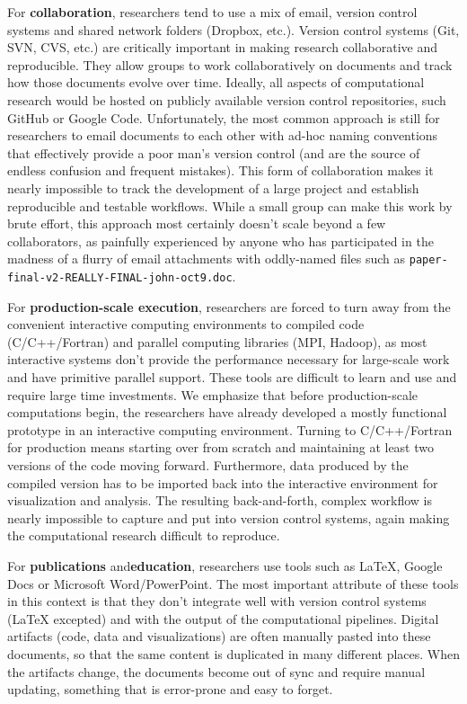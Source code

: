\documentclass[ChapterTOCs,krantz2]{krantz} %
\begin{document}
For \textbf{collaboration}, researchers tend to use a mix of email, version
control systems and shared network folders (Dropbox, etc.).  Version control
systems (Git, SVN, CVS, etc.) are critically important in making research
collaborative and reproducible. They allow groups to work collaboratively on
documents and track how those documents evolve over time. Ideally, all aspects
of computational research would be hosted on publicly available version control
repositories, such GitHub or Google Code. Unfortunately, the most common
approach is still for researchers to email documents to each other with ad-hoc
naming conventions that effectively provide a poor man's version control (and
are the source of endless confusion and frequent mistakes). This form of
collaboration makes it nearly impossible to track the development of a large
project and establish reproducible and testable workflows.  While a small group
can make this work by brute effort, this approach most certainly doesn't scale
beyond a few collaborators, as painfully experienced by anyone who has
participated in the madness of a flurry of email attachments with oddly-named
files such as {\tt paper-final-v2-REALLY-FINAL-john-oct9.doc}.

For \textbf{production-scale execution}, researchers are forced to turn away
from the convenient interactive computing environments to compiled code
(C/C++/Fortran) and parallel computing libraries (MPI, Hadoop), as most
interactive systems don't provide the performance necessary for large-scale
work and have primitive parallel support.  These tools are difficult to learn
and use and require large time investments. We emphasize that before
production-scale computations begin, the researchers have already developed a
mostly functional prototype in an interactive computing environment. Turning to
C/C++/Fortran for production means starting over from scratch and maintaining
at least two versions of the code moving forward. Furthermore, data produced by
the compiled version has to be imported back into the interactive environment
for visualization and analysis. The resulting back-and-forth, complex workflow
is nearly impossible to capture and put into version control systems, again
making the computational research difficult to reproduce.

For \textbf{publications} and\textbf{education}, researchers use tools such as
\LaTeX, Google Docs or Microsoft Word/PowerPoint.  The most important attribute
of these tools in this context is that they don't integrate well with version
control systems (\LaTeX{} excepted) and with the output of the computational
pipelines. Digital artifacts (code, data and visualizations) are often manually
pasted into these documents, so that the same content is duplicated in many
different places. When the artifacts change, the documents become out of sync
and require manual updating, something that is error-prone and easy to forget.
\end{document}
